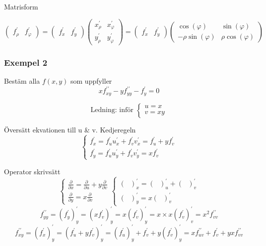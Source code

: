 \documentclass{article}
\begin{document}
Matrisform

\[
	\begin{pmatrix}f_{\rho}^{\prime} & f_{\varphi}^{\prime}\end{pmatrix} =
	\begin{pmatrix}f_{x}^{\prime} & f_{y}^{\prime}\end{pmatrix}
	\begin{pmatrix}x_{\rho}^{\prime} & x_{\varphi}^{\prime} \\
	y_{\rho}^{\prime} & y_{\varphi}^{\prime}\end{pmatrix} =
	\begin{pmatrix}f_{x}^{\prime} & f_{y}^{\prime}\end{pmatrix}
	\begin{pmatrix}\cos(\varphi) & \sin(\varphi) \\
	-\rho\sin(\varphi) & \rho\cos(\varphi)\end{pmatrix}
\]

\newpage

\subsubsection{Exempel 2} \label{eq:4.3}
Bestäm alla \(f(x,y)\) som uppfyller
\begin{equation}
	xf_{xy}^{\prime\prime} - yf_{yy}^{\prime\prime} - f_{y}^{\prime} = 0
\end{equation}

\[
\text{Ledning: inför }
\left\{\begin{array}{rcl}
	u = x \\
	v = xy
\end{array}\right.
\]

Översätt ekvationen till u \& v. Kedjeregeln
\[
\left\{\begin{array}{rcl}
	f_{x}^{\prime} = f_{u}^{\prime}u_{x}^{\prime} + f_{v}^{\prime}v_{x}^{\prime} = f_{u}^{\prime} + yf_{v}^{\prime} \\
	f_{y}^{\prime} = f_{u}^{\prime}u_{y}^{\prime} + f_{v}^{\prime}v_{y}^{\prime} = xf_{v}^{\prime} 
\end{array}\right.
\]

Operator skrivsätt
\[
\left\{\begin{array}{rcl}
	\frac{\partial}{\partial x} = \frac{\partial}{\partial u} + y\frac{\partial}{\partial v}\\
	\frac{\partial}{\partial y} = x\frac{\partial}{\partial v}
\end{array}\right.
\left\{\begin{array}{rcl}
	(\text{ })_{x}^{\prime} = (\text{ })_{u}^{\prime} + (\text{ })_{v}^{\prime} \\
	(\text{ })_{y}^{\prime} = x(\text{ })_{v}^{\prime}
\end{array}\right.
\]
\[
	f_{yy}^{\prime\prime} = (f_{y}^{\prime})_{y}^{\prime} = (xf_{v}^{\prime})_{y}^{\prime} = x(f_{v}^{\prime})_{y}^{\prime} = x \times x(f_{v}^{\prime})_{v}^{\prime} = x^2 f_{vv}^{\prime\prime}
\]
\[
	f_{xy}^{\prime\prime} = (f_{x}^{\prime})_{y}^{\prime} = (f_{u}^{\prime} + yf_{v}^{\prime})_{y}^{\prime} =
	(f_{u}^{\prime})_{y}^{\prime} + f_{v}^{\prime} + y(f_{v}^{\prime})_{y}^{\prime} =
	xf_{uv}^{\prime\prime} + f_{v}^{\prime} + yxf_{vv}^{\prime\prime}
\]
\end{document}
